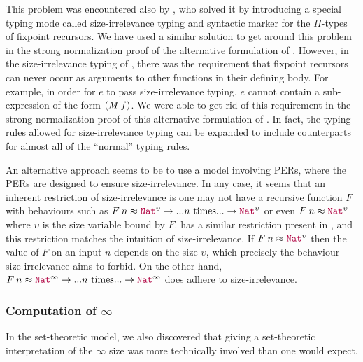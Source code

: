 This problem was encountered also by \citet{barras-thesis}, who solved
it by introducing a special typing mode called size-irrelevance typing
and syntactic marker for the $\Pi$-types of fixpoint recursors.
%
We have used a similar solution to get around this problem in the
strong normalization proof of the alternative formulation of \lang.
%
However, in the size-irrelevance typing of \citet{barras-thesis},
there was the requirement that fixpoint recursors can never occur as
arguments to other functions in their defining body.
%
For example, in order for $e$ to pass size-irrelevance typing, $e$
cannot contain a sub-expression of the form $(\app{M}{f})$.
%
We were able to get rid of this requirement in the strong
normalization proof of this alternative formulation of \lang.
%
In fact, the typing rules allowed for size-irrelevance typing can be
expanded to include counterparts for almost all of the ``normal''
typing rules.

An alternative approach seems to be to use a model involving PERs,
where the PERs are designed to ensure size-irrelevance.
%
In any case, it seems that an inherent restriction of size-irrelevance
is one may not have a recursive function $F$ with behaviours such as
$\app{F}{n} \approx \Nat^\upsilon \to ...n\text{ times}... \to
\Nat^\upsilon$ or even $\app{F}{n} \approx \Nat^\upsilon$ where
$\upsilon$ is the size variable bound by $F$.
%
\citet{cic-hat-minus} has a similar restriction present in
\CIChatminus, and this restriction matches the intuition of
size-irrelevance.
%
If $\app{F}{n} \approx \Nat^\upsilon$ then the value of $F$ on an
input $n$ depends on the size $\upsilon$, which precisely the
behaviour size-irrelevance aims to forbid.
%
On the other hand, $\app{F}{n} \approx \Nat^\infty \to
...n\text{ times}...\to\Nat^\infty$ does adhere to size-irrelevance.

\subsubsection{Computation of $\infty$}
%
In the set-theoretic model, we also discovered that giving a
set-theoretic interpretation of the $\infty$ size was more technically
involved than one would expect.

